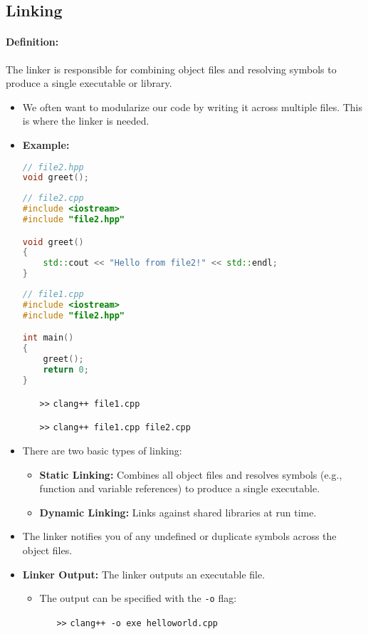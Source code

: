 \documentclass{article}
\begin{document}
\subsection{Linking}

\paragraph{Definition:}
The linker is responsible for combining object files and resolving symbols to produce a single executable or library.

\begin{itemize}
	\item We often want to modularize our code by writing it across multiple files. This is where the linker is needed.
	\item \textbf{Example:}
\begin{lstlisting}[language=C++]
// file2.hpp
void greet();
\end{lstlisting}
\begin{lstlisting}[language=C++]
// file2.cpp
#include <iostream>
#include "file2.hpp"

void greet()
{
	std::cout << "Hello from file2!" << std::endl;
}
\end{lstlisting}
\begin{lstlisting}[language=C++]
// file1.cpp
#include <iostream>
#include "file2.hpp"

int main()
{
	greet();
	return 0;
}
\end{lstlisting}
	\begin{itemize}
		\item[\texttt{>>}] \texttt{clang++ file1.cpp} 
		\item[\texttt{>>}] \texttt{clang++ file1.cpp file2.cpp} 
	\end{itemize}
	\item There are two basic types of linking:
	\begin{itemize}
		\item \textbf{Static Linking:} Combines all object files and resolves symbols (e.g., function and variable references) to produce a single executable.
		\item \textbf{Dynamic Linking:} Links against shared libraries at run time.
	\end{itemize}
	\item The linker notifies you of any undefined or duplicate symbols across the object files.
	\item \textbf{Linker Output:} The linker outputs an executable file.
	\begin{itemize}
		\item The output can be specified with the \texttt{-o} flag:
		\begin{itemize}
			\item[\texttt{>>}] \texttt{clang++ -o exe helloworld.cpp}
		\end{itemize}
	\end{itemize}
\end{itemize}
\end{document}
